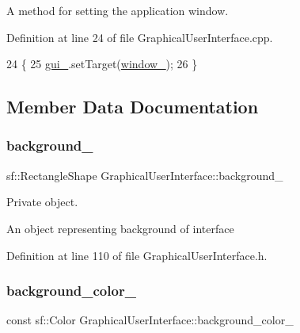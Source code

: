 A method for setting the application window. 



Definition at line 24 of file Graphical\+User\+Interface.\+cpp.


\begin{DoxyCode}
24                                        \{
25     \hyperlink{classGraphicalUserInterface_ab07abda0fdb8e2965b70d2024fa3cf20}{gui\_}.setTarget(\hyperlink{classGraphicalUserInterface_ae51adeb759a97196eda3b37bfc80a452}{window\_});
26 \}
\end{DoxyCode}


\subsection{Member Data Documentation}
\mbox{\label{classGraphicalUserInterface_a6d706ef82ec59d143a009331b40681bb}} 
\subsubsection{\texorpdfstring{background\+\_\+}{background\_}}
{\footnotesize\ttfamily sf\+::\+Rectangle\+Shape Graphical\+User\+Interface\+::background\+\_\+\hspace{0.3cm}{\ttfamily [private]}}



Private object. 

An object representing background of interface 

Definition at line 110 of file Graphical\+User\+Interface.\+h.

\mbox{\label{classGraphicalUserInterface_a0361d82710bb150c272a2a760164241f}} 
\subsubsection{\texorpdfstring{background\+\_\+color\+\_\+}{background\_color\_}}
{\footnotesize\ttfamily const sf\+::\+Color Graphical\+User\+Interface\+::background\+\_\+color\+\_\+\hspace{0.3cm}{\ttfamily [private]}}



